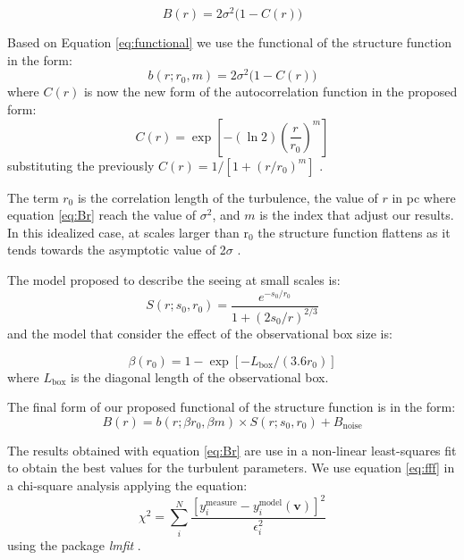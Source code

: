 \documentclass[fleqn,usenatbib, useAMS, a4paper]{mnras}
\begin{document}
\begin{equation}\label{eq:functional}
B(r) = 2\sigma^2 \bigl( 1 - C(r) \bigr)
\end{equation}

Based on Equation \ref{eq:functional} we use the functional of the structure function in the form:
%
\begin{equation}\label{eq:ff}
b(r; r_0, m) = 2\sigma^2 \bigl( 1 - C(r) \bigr)
\end{equation}
%
where $C(r)$ is now the new form of the autocorrelation function in the proposed form:
%
\begin{equation}\label{eq:ffnew}
  C(r) = \exp \left[ -(\ln 2) \left( \frac{r}{r_0} \right)^m \right]
\end{equation}
%
substituting the previously $C(r)=1/[1+(r/r_{0})^{m}]$ \citep{1966igd..book.....K,1984ApJ...277..556S}.

The term $r_{0}$ is the correlation length of the turbulence, the value of \(r\) in pc where equation \ref{eq:Br} reach the value of \(\sigma^2\), and $m$ is the index that adjust our results.
In this idealized case, at scales larger than r$_{0}$ the structure function flattens as it tends towards the asymptotic value of 2$\sigma$ \citep{arthur2016turbulence}.

The model proposed to describe the seeing at small scales is:
%
\begin{equation}\label{eq:ffs}
  S(r; s_0, r_0) = \frac{
    e^{-s_0 / r_0}
  }{
    1+(2s_0 / r)^{2 / 3}
  }
\end{equation}
%
and the model that consider the effect of the observational box size is:

\begin{equation}\label{eq:ffb}
  \beta(r_0) = 1 - \exp \left[ -L_{\text{box}} / (3.6 r_0) \right] 
\end{equation}
%
where $L_{\text{box}}$ is the diagonal length of the observational box.

The final form of our proposed functional of the structure function is in the form:
%
\begin{equation}\label{eq:fff}
B(r) = b(r; \beta r_0, \beta m) \times S(r; s_0, r_0) + B_{\text{noise}}
\end{equation}

The results obtained with equation \ref{eq:Br} are use in a non-linear least-squares
fit to obtain the best values for the turbulent parameters. 
We use equation \ref{eq:fff} in a chi-square analysis applying the equation:
%
\begin{equation}\label{eq:chi}
  \chi^2 = \sum_i ^N \frac{[y_i^{\text{measure}}-y_i^{\text{model}} (\boldsymbol{v})]^2}{\epsilon_i ^2}
\end{equation}
%
using the package \textit{lmfit} \citep{newville_matthew_2014_11813}. 
\end{document}
